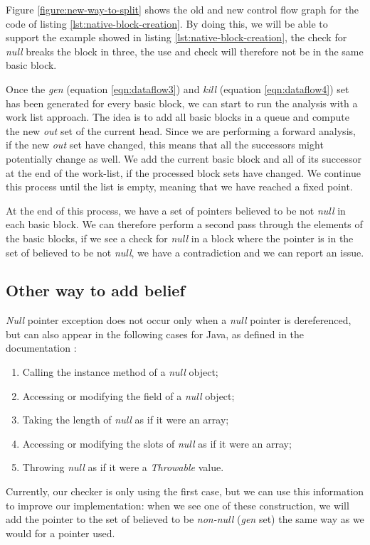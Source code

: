 Figure \ref{figure:new-way-to-split} shows the old and new control flow graph for the code of listing \ref{lst:native-block-creation}. 
By doing this, we will be able to support the example showed in listing \ref{lst:native-block-creation}, the check for \emph{null} breaks the block in three, the use and check will therefore not be in the same basic block.

Once the \emph{gen} (equation \eqref{eqn:dataflow3}) and \emph{kill} (equation \eqref{eqn:dataflow4}) set has been generated for every basic block, we can start to run the analysis with a work list approach.
The idea is to add all basic blocks in a queue and compute the new \emph{out} set of the current head. 
Since we are performing a forward analysis, if the new \emph{out} set have changed, this means that all the successors might potentially change as well. 
We add the current basic block and all of its successor at the end of the work-list, if the processed block sets have changed. 
We continue this process until the list is empty, meaning that we have reached a fixed point.

At the end of this process, we have a set of pointers believed to be not \emph{null} in each basic block.
We can therefore perform a second pass through the elements of the basic blocks, if we see a check for \emph{null} in a block where the pointer is in the set of believed to be not \emph{null}, we have a contradiction and we can report an issue.

\subsection{Other way to add belief}
\label{subsec:other_way_to_add_belief}

\emph{Null} pointer exception does not occur only when a \emph{null} pointer is dereferenced, but can also appear in the following cases for Java, as defined in the documentation \cite{OracleDoc:2019:Online}:

\begin{enumerate}
	\item Calling the instance method of a \emph{null} object;
	\item Accessing or modifying the field of a \emph{null} object;
	\item Taking the length of \emph{null} as if it were an array;
	\item Accessing or modifying the slots of \emph{null} as if it were an array;
	\item Throwing \emph{null} as if it were a \emph{Throwable} value.
\end{enumerate}
Currently, our checker is only using the first case, but we can use this information to improve our implementation: when we see one of these construction, we will add the pointer to the set of believed to be \emph{non-null} (\emph{gen} set) the same way as we would for a pointer used.



